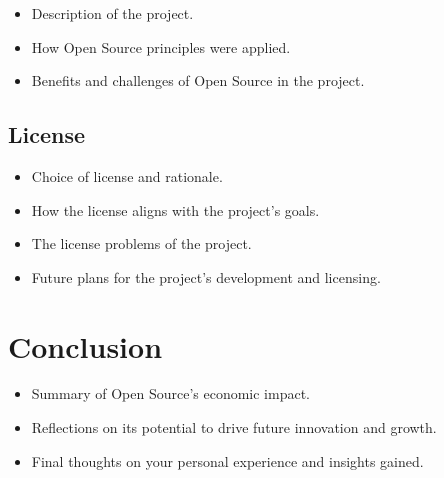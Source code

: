 \begin{itemize}
    \item Description of the project.
    \item How Open Source principles were applied.
    \item Benefits and challenges of Open Source in the project.
\end{itemize}
\subsection{License}

\begin{itemize}
    \item Choice of license and rationale.
    \item How the license aligns with the project’s goals.
    \item The license problems of the project.
    \item Future plans for the project’s development and licensing.
\end{itemize}

\section{Conclusion}

\begin{itemize}
    \item Summary of Open Source’s economic impact.
    \item Reflections on its potential to drive future innovation and growth.
    \item Final thoughts on your personal experience and insights gained.
\end{itemize}

